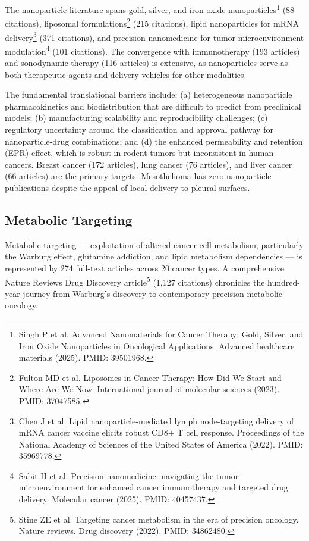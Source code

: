 \documentclass[11pt,twoside,openright]{report}
\begin{document}
The nanoparticle literature spans gold, silver, and iron oxide nanoparticles\footnote{Singh P et al. Advanced Nanomaterials for Cancer Therapy: Gold, Silver, and Iron Oxide Nanoparticles in Oncological Applications. Advanced healthcare materials (2025). PMID: 39501968.} (88 citations), liposomal formulations\footnote{Fulton MD et al. Liposomes in Cancer Therapy: How Did We Start and Where Are We Now. International journal of molecular sciences (2023). PMID: 37047585.} (215 citations), lipid nanoparticles for mRNA delivery\footnote{Chen J et al. Lipid nanoparticle-mediated lymph node-targeting delivery of mRNA cancer vaccine elicits robust CD8+ T cell response. Proceedings of the National Academy of Sciences of the United States of America (2022). PMID: 35969778.} (371 citations), and precision nanomedicine for tumor microenvironment modulation\footnote{Sabit H et al. Precision nanomedicine: navigating the tumor microenvironment for enhanced cancer immunotherapy and targeted drug delivery. Molecular cancer (2025). PMID: 40457437.} (101 citations). The convergence with immunotherapy (193 articles) and sonodynamic therapy (116 articles) is extensive, as nanoparticles serve as both therapeutic agents and delivery vehicles for other modalities.

The fundamental translational barriers include: (a) heterogeneous nanoparticle pharmacokinetics and biodistribution that are difficult to predict from preclinical models; (b) manufacturing scalability and reproducibility challenges; (c) regulatory uncertainty around the classification and approval pathway for nanoparticle-drug combinations; and (d) the enhanced permeability and retention (EPR) effect, which is robust in rodent tumors but inconsistent in human cancers. Breast cancer (172 articles), lung cancer (76 articles), and liver cancer (66 articles) are the primary targets. Mesothelioma has zero nanoparticle publications despite the appeal of local delivery to pleural surfaces.

\subsection{Metabolic Targeting}

Metabolic targeting --- exploitation of altered cancer cell metabolism, particularly the Warburg effect, glutamine addiction, and lipid metabolism dependencies --- is represented by 274 full-text articles across 20 cancer types. A comprehensive Nature Reviews Drug Discovery article\footnote{Stine ZE et al. Targeting cancer metabolism in the era of precision oncology. Nature reviews. Drug discovery (2022). PMID: 34862480.} (1,127 citations) chronicles the hundred-year journey from Warburg's discovery to contemporary precision metabolic oncology.
\end{document}
